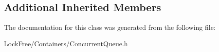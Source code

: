 \subsection*{Additional Inherited Members}


The documentation for this class was generated from the following file\-:\begin{DoxyCompactItemize}
\item 
Lock\-Free/\-Containers/Concurrent\-Queue.\-h\end{DoxyCompactItemize}
